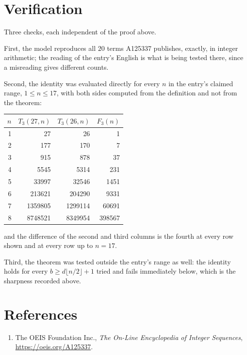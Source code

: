 \documentclass[11pt,a4paper]{article}
\theoremstyle{plain}
\theoremstyle{definition}
\begin{document}
\section{Verification}

Three checks, each independent of the proof above.

First, the model reproduces all $20$ terms A125337 publishes, exactly, in integer
arithmetic; the reading of the entry's English is what is being tested there, since a
misreading gives different counts.

Second, the identity was evaluated directly for every $n$ in the entry's claimed range,
$1\le n\le17$, with both sides computed from the definition and not from the theorem:

\begin{center}
\begin{tabular}{rrrr}
$n$ & $T_{3}(27,n)$ & $T_{3}(26,n)$ & $F_{3}(n)$ \\ \hline
1 & 27 & 26 & 1 \\
2 & 177 & 170 & 7 \\
3 & 915 & 878 & 37 \\
4 & 5545 & 5314 & 231 \\
5 & 33997 & 32546 & 1451 \\
6 & 213621 & 204290 & 9331 \\
7 & 1359805 & 1299114 & 60691 \\
8 & 8748521 & 8349954 & 398567 \\
\end{tabular}
\end{center}

\noindent and the difference of the second and third columns is the fourth at every row shown
and at every row up to $n=17$.

Third, the theorem was tested outside the entry's range as well: the identity holds for every
$b\ge d\lfloor n/2\rfloor+1$ tried and fails immediately below, which is the sharpness recorded
above.

\section*{References}
\begin{enumerate}
\item The OEIS Foundation Inc., \emph{The On-Line Encyclopedia of Integer Sequences},
\url{https://oeis.org/A125337}.
\end{enumerate}
\end{document}
